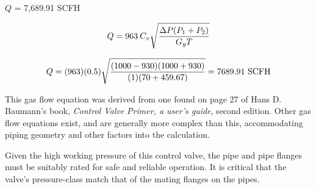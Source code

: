 





$Q$ = 7,689.91 SCFH
 






$$Q = 963 \> C_v \sqrt{{\Delta P (P_1 + P_2)} \over {G_g T}}$$

$$Q = (963) (0.5) \sqrt{{(1000 - 930) (1000 + 930)} \over {(1) (70 +459.67)}} = 7689.91 \hbox{ SCFH}$$

\vskip 10pt

This gas flow equation was derived from one found on page 27 of Hans D. Baumann's book, {\it Control Valve Primer, a user's guide}, second edition.  Other gas flow equations exist, and are generally more complex than this, accommodating piping geometry and other factors into the calculation.

\vskip 10pt

Given the high working pressure of this control valve, the pipe and pipe flanges must be suitably rated for safe and reliable operation.  It is critical that the valve's pressure-class match that of the mating flanges on the pipes.




